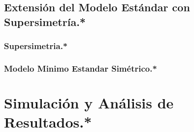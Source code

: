 \documentclass[11pt,english]{report}
\begin{document}
		

	\section{Extensión del Modelo Estándar con Supersimetría.*}
	
	
		\subsection{Supersimetria.*}
		
		
		\subsection{Modelo Minimo Estandar Simétrico.*}		
		
		
		
		
	

\chapter{Simulación y Análisis de Resultados.*}
%




\end{document}
